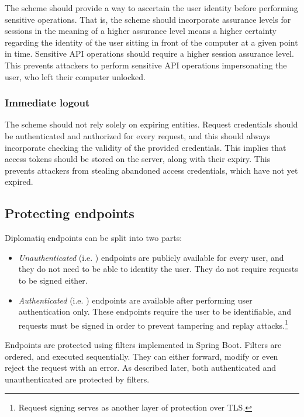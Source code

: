 The scheme should provide a way to ascertain the user identity before performing sensitive operations. That is, the scheme should incorporate assurance levels for sessions in the meaning of a higher assurance level means a higher certainty regarding the identity of the user sitting in front of the computer at a given point in time. Sensitive API operations should require a higher session assurance level. This prevents attackers to perform sensitive API operations impersonating the user, who left their computer unlocked.

\subsubsection{Immediate logout}

The scheme should not rely solely on expiring entities. Request credentials should be authenticated and authorized for every request, and this should always incorporate checking the validity of the provided credentials. This implies that access tokens should be stored on the server, along with their expiry. This prevents attackers from stealing abandoned access credentials, which have not yet expired.

\subsection{Protecting endpoints}

Diplomatiq endpoints can be split into two parts:

\begin{itemize}
\item \emph{Unauthenticated} (i.e. ) endpoints are publicly available for every user, and they do not need to be able to identity the user. They do not require requests to be signed either.
\item \emph{Authenticated} (i.e. ) endpoints are available after performing user authentication only. These endpoints require the user to be identifiable, and requests must be signed in order to prevent tampering and replay attacks.\footnote{Request signing serves as another layer of protection over TLS.}
\end{itemize}

Endpoints are protected using filters implemented in Spring Boot. Filters are ordered, and executed sequentially. They can either forward, modify or even reject the request with an error. As described later, both authenticated and unauthenticated are protected by filters.

